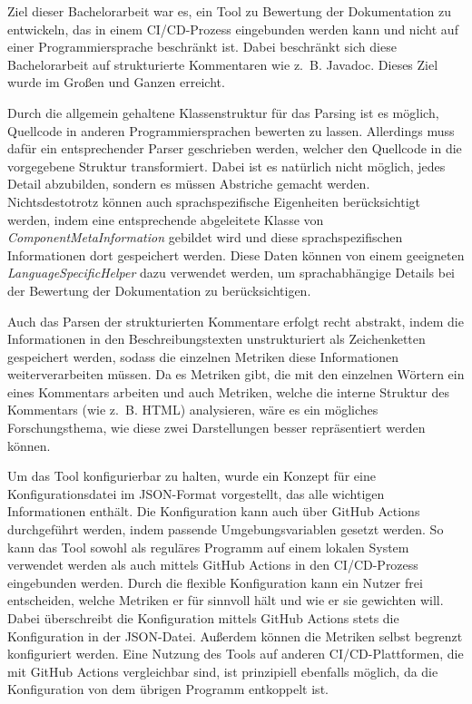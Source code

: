 Ziel dieser Bachelorarbeit war es, ein Tool zu Bewertung der Dokumentation zu entwickeln, das in einem \ac{CI/CD}-Prozess eingebunden werden kann und nicht auf einer Programmiersprache beschränkt ist. Dabei beschränkt sich diese Bachelorarbeit auf strukturierte Kommentaren wie z.~B. Javadoc. Dieses Ziel wurde im Großen und Ganzen erreicht.

Durch die allgemein gehaltene Klassenstruktur für das Parsing ist es möglich, Quellcode in anderen Programmiersprachen bewerten zu lassen. Allerdings muss dafür ein entsprechender Parser geschrieben werden, welcher den Quellcode in die vorgegebene Struktur transformiert. Dabei ist es natürlich nicht möglich, jedes Detail abzubilden, sondern es müssen Abstriche gemacht werden. Nichtsdestotrotz können auch sprachspezifische Eigenheiten berücksichtigt werden, indem eine entsprechende abgeleitete Klasse von \textit{ComponentMetaInformation} gebildet wird und diese sprachspezifischen Informationen dort gespeichert werden. Diese Daten können von einem geeigneten \textit{LanguageSpecificHelper} dazu verwendet werden, um sprachabhängige Details bei der Bewertung der Dokumentation zu berücksichtigen. 

Auch das Parsen der strukturierten Kommentare erfolgt recht abstrakt, indem  die Informationen in den Beschreibungstexten unstrukturiert als Zeichenketten gespeichert werden, sodass die einzelnen Metriken diese Informationen weiterverarbeiten müssen. Da es Metriken gibt, die mit den einzelnen Wörtern ein eines Kommentars arbeiten und auch Metriken, welche die interne Struktur des Kommentars (wie z.~B. \ac{HTML}) analysieren, wäre es ein mögliches Forschungsthema, wie diese zwei Darstellungen besser repräsentiert werden können. 

Um das Tool konfigurierbar zu halten, wurde ein Konzept für eine Konfigurationsdatei im \ac{JSON}-Format vorgestellt, das alle wichtigen Informationen enthält. Die Konfiguration kann auch über GitHub Actions durchgeführt werden, indem passende Umgebungsvariablen gesetzt werden.  So kann das Tool sowohl als reguläres Programm auf einem lokalen System verwendet werden als auch mittels GitHub Actions in den \ac{CI/CD}-Prozess eingebunden werden. Durch die flexible Konfiguration kann ein Nutzer frei entscheiden, welche Metriken er für sinnvoll hält und wie er sie gewichten will. Dabei überschreibt die Konfiguration mittels GitHub Actions stets die Konfiguration in der \ac{JSON}-Datei. Außerdem können die Metriken selbst begrenzt konfiguriert werden. Eine Nutzung des Tools auf anderen \ac{CI/CD}-Plattformen, die mit GitHub Actions vergleichbar sind,  ist prinzipiell ebenfalls möglich, da die Konfiguration von dem  übrigen Programm entkoppelt ist.

